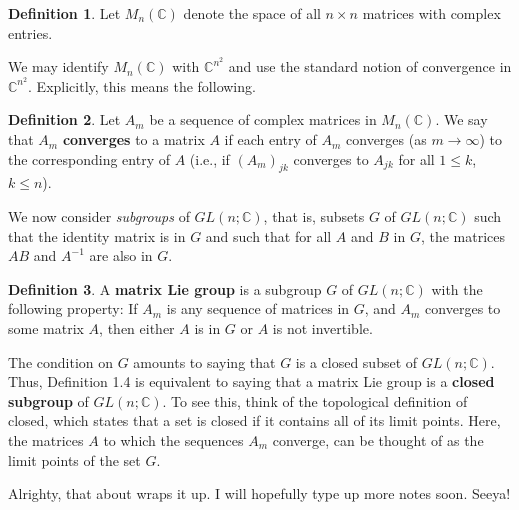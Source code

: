 \documentclass{article}
\theoremstyle{definition}
\newtheorem{definition}{Definition}[section]
\theoremstyle{remark}
\begin{document}
\begin{definition}
    Let $M_n(\mathbb{C})$ denote the space of all $n\times n$ matrices with complex entries.
\end{definition}

We may identify $M_n(\mathbb{C})$ with $\mathbb{C}^{n^2}$ and use the standard notion of convergence in $\mathbb{C}^{n^2}$. Explicitly, this means the following.

\begin{definition}
    Let $A_m$ be a sequence of complex matrices in $M_n(\mathbb{C})$. We say that $A_m$ \textbf{converges} to a matrix $A$ if each entry of $A_m$ converges (as $m\rightarrow\infty$) to the corresponding entry of $A$ (i.e., if $(A_m)_{jk}$ converges to $A_{jk}$ for all $1\leq k$, $k\leq n$). 
\end{definition}

We now consider \textit{subgroups} of $GL(n;\mathbb{C})$, that is, subsets $G$ of $GL(n;\mathbb{C})$ such that the identity matrix is in $G$ and such that for all $A$ and $B$ in $G$, the matrices $AB$ and $A^{-1}$ are also in $G$.

\begin{definition}
    A \textbf{matrix Lie group} is a subgroup $G$ of $GL(n;\mathbb{C})$ with the following property: If $A_m$ is any sequence of matrices in $G$, and $A_m$ converges to some matrix $A$, then either $A$ is in $G$ or $A$ is not invertible.
\end{definition}

The condition on $G$ amounts to saying that $G$ is a closed subset of $GL(n;\mathbb{C})$. Thus, Definition 1.4 is equivalent to saying that a matrix Lie group is a \textbf{closed subgroup} of $GL(n;\mathbb{C})$. To see this, think of the topological definition of closed, which states that a set is closed if it contains all of its limit points. Here, the matrices $A$ to which the sequences $A_m$ converge, can be thought of as the limit points of the set $G$.\par 
Alrighty, that about wraps it up. I will hopefully type up more notes soon. Seeya!
\end{document}
